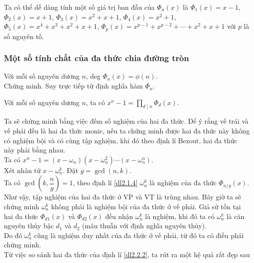 \begin{vd}
	Ta có thể dễ dàng tính một số giá trị ban đầu của $\Phi_n(x)$ là $\Phi_1(x)=x-1$, $\Phi_2(x)=x+1$, $\Phi_3(x)=x^2+x+1$, $\Phi_4(x)=x^2+1$, $\Phi_5(x)=x^4+x^3+x^2+x+1$, $\Phi_p(x)= x^{p-1}+ x^{p-2}+\cdots + x^2+x+1$ với $p$ là số nguyên tố.
\end{vd}
\subsubsection{Một số tính chất của đa thức chia đường tròn}
\begin{dl}
	Với mỗi số nguyên dương $n$, deg $\Phi_n(x) = \phi(n)$.\\
	Chứng minh. Suy trực tiếp từ định nghĩa hàm $\Phi_n$.
\end{dl}

\begin{dl}\label{dl2.2.2}
	Với mỗi số nguyên dương $n$, ta có $x^n - 1 = \prod\limits_{d \mid n}{\Phi _d(x)}.$  
\end{dl}
Ta sẽ chứng minh bằng việc đếm số nghiệm của hai đa thức. Để ý rằng vế trái và
vế phải đều là hai đa thức monic, nếu ta chứng minh được hai đa thức này không có nghiệm bội
và có cùng tập nghiệm, khi đó theo định lí Bezout, hai đa thức này phải bằng nhau.\\
Ta có $x^n-1 = (x-\omega_n)(x-\omega_n^2)\cdots (x-\omega_n^n)$.\\
Xét nhân tử $x-\omega_n^k$. Đặt $g=\gcd(n,k)$.\\
Ta có $\gcd\left( k,\dfrac{n}{g}\right) =1$, theo định lí \eqref{dl2.1.4} $\omega_n^k$ là nghiệm của đa thức $\Phi_{n/g}(x)$.\\
Như vậy, tập nghiệm của hai đa thức ở VP và VT là trùng nhau. Bây giờ ta sẽ chứng minh
$\omega_n^k$ không phải là nghiệm bội của đa thức ở vế phải. Giả sử tồn tại hai đa thức  $\Phi_{d1}(x)$ và $\Phi_{d2}(x)$
	đều nhận $\omega_n^k$ là nghiệm, khi đó ta có $\omega_n^k$ là căn nguyên thủy bậc $d_1$ và $d_2$ (mâu thuẫn với định nghĩa nguyên thủy).\\
Do đó $\omega_n^k$ cũng là nghiệm duy nhất của đa thức ở vế phải, từ đó ta có điều phải chứng minh.\\
Từ việc so sánh hai đa thức của định lí 
\eqref{dl2.2.2}, ta rút ra một hệ quả rất đẹp sau

